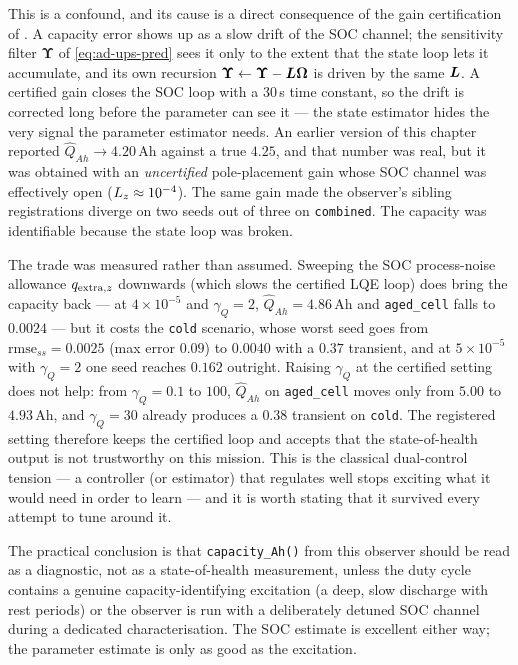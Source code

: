 This is a confound, and its cause is a direct consequence of the gain certification of
.  A capacity error shows up as a slow drift of the SOC channel; the
sensitivity filter $\bm{\Upsilon}$ of \eqref{eq:ad-ups-pred} sees it only to the extent that the state
loop lets it accumulate, and its own recursion $\bm{\Upsilon}\leftarrow\bm{\Upsilon}-\bm{L}\bm{\Omega}$
is driven by the same $\bm{L}$.  A certified gain closes the SOC loop with a $30$\,s time constant,
so the drift is corrected long before the parameter can see it --- the state estimator hides the
very signal the parameter estimator needs.  An earlier version of this chapter reported
$\hat{Q}_{Ah}\to4.20$\,Ah against a true $4.25$, and that number was real, but it was obtained
with an \emph{uncertified} pole-placement gain whose SOC channel was effectively open
($L_{z}\approx10^{-4}$).  The same gain made the observer's sibling registrations diverge on two
seeds out of three on \texttt{combined}.  The capacity was identifiable because the state loop was
broken.

The trade was measured rather than assumed.  Sweeping the SOC process-noise allowance
$q_{\text{extra},z}$ downwards (which slows the certified LQE loop) does bring the capacity
back --- at $4\times10^{-5}$ and $\gamma_Q=2$, $\hat{Q}_{Ah}=4.86$\,Ah and \texttt{aged\_cell}
falls to $0.0024$ --- but it costs the \texttt{cold} scenario, whose worst seed goes from
$\mathrm{rmse}_{ss}=0.0025$ (max error $0.09$) to $0.0040$ with a $0.37$ transient, and at
$5\times10^{-5}$ with $\gamma_Q=2$ one seed reaches $0.162$ outright.  Raising $\gamma_Q$ at the
certified setting does not help: from $\gamma_Q=0.1$ to $100$, $\hat{Q}_{Ah}$ on
\texttt{aged\_cell} moves only from $5.00$ to $4.93$\,Ah, and $\gamma_Q=30$ already produces a
$0.38$ transient on \texttt{cold}.  The registered setting therefore keeps the certified loop and
accepts that the state-of-health output is not trustworthy on this mission.  This is the classical
dual-control tension --- a controller (or estimator) that regulates well stops exciting what it
would need in order to learn --- and it is worth stating that it survived every attempt to tune
around it.

The practical conclusion is that \texttt{capacity\_Ah()} from this observer should be read as a
diagnostic, not as a state-of-health measurement, unless the duty cycle contains a genuine
capacity-identifying excitation (a deep, slow discharge with rest periods) or the observer is run
with a deliberately detuned SOC channel during a dedicated characterisation.  The SOC estimate is
excellent either way; the parameter estimate is only as good as the excitation.

